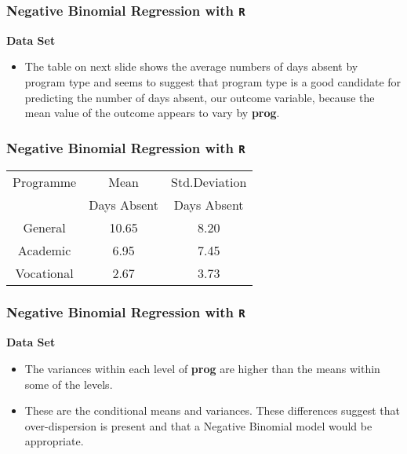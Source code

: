 \documentclass[MASTER.tex]{subfiles}
\begin{document}
\begin{frame}[fragile]
	\frametitle{Negative Binomial Regression with \texttt{R} }
	\Large
\textbf{Data Set}
\begin{itemize}
\item The table on next slide shows the average numbers of days absent by program type and seems to 
	suggest that program type is a good candidate for predicting the number of days absent, our outcome variable, 
	because the mean value of the outcome appears to vary by \textbf{prog}. 
	\end{itemize}
\end{frame}
\begin{frame}[fragile]
	\frametitle{Negative Binomial Regression with \texttt{R} }
	\Large
\begin{center}
	\begin{tabular}{|c|c|c|} \hline
		Programme & Mean & Std.Deviation \\ 
		&Days Absent& Days Absent\\\hline
		General & 10.65 & 8.20 \\ \hline
		Academic & 6.95 & 7.45 \\ \hline
		Vocational & 2.67 & 3.73\\ \hline
	\end{tabular} 
\end{center}	


\end{frame}
\begin{frame}[fragile]
	\frametitle{Negative Binomial Regression with \texttt{R} }
	\Large
\textbf{Data Set}
\begin{itemize}	
\item The variances within each level of \textbf{prog} are higher than the means within some of the levels. 
\item These are the conditional means and variances. These differences suggest that over-dispersion is present and 
that a Negative Binomial model would be appropriate.
\end{itemize}
\end{frame}
\end{document}
